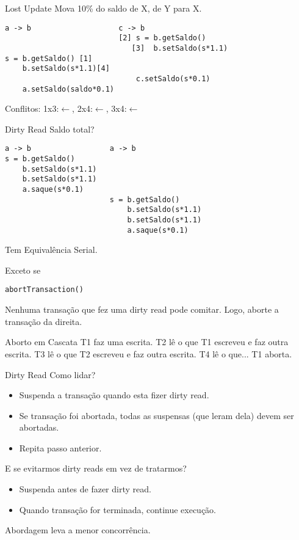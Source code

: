 \begin{frame}[fragile]{Lost Update}
Mova 10\% do saldo de X, de Y para X.
\begin{verbatim}
a -> b                    c -> b
                          [2] s = b.getSaldo()
                             [3]  b.setSaldo(s*1.1)
s = b.getSaldo() [1]
    b.setSaldo(s*1.1)[4]                                        
                              c.setSaldo(s*0.1)
    a.setSaldo(saldo*0.1)
\end{verbatim}

Conflitos: 1x3:$\leftarrow$, 2x4:$\leftarrow$, 3x4:$\leftarrow$
\end{frame}


\begin{frame}[fragile]{Dirty Read}
Saldo total?
\begin{verbatim}
a -> b                  a -> b
s = b.getSaldo()
    b.setSaldo(s*1.1)
    b.setSaldo(s*1.1)                                        
    a.saque(s*0.1)
                        s = b.getSaldo()
                            b.setSaldo(s*1.1)
                            b.setSaldo(s*1.1)                                        
                            a.saque(s*0.1)
\end{verbatim}
\pause Tem Equivalência Serial.

\pause Exceto se
\begin{verbatim}
abortTransaction()
\end{verbatim}
\pause Nenhuma transação que fez uma dirty read pode comitar. Logo, aborte a transação da direita.
\end{frame}


\begin{frame}{Aborto em Cascata}
T1 faz uma escrita. T2 lê o que T1 escreveu e faz outra escrita. T3 lê o que T2 escreveu e faz outra escrita. T4 lê o que... \alert{T1 aborta.}
\end{frame}

\begin{frame}{Dirty Read}
Como lidar?
\begin{itemize}
	\item Suspenda a transação quando esta fizer dirty read.
	\item Se transação foi abortada, todas as suspensas (que leram dela) devem ser abortadas.
	\item Repita passo anterior.
\end{itemize}

\pause E se evitarmos dirty reads em vez de tratarmos?
\pause
\begin{itemize}
	\item Suspenda antes de fazer dirty read.
	\item Quando transação for terminada, continue execução.
\end{itemize}
\pause Abordagem leva a menor concorrência.
\end{frame}

